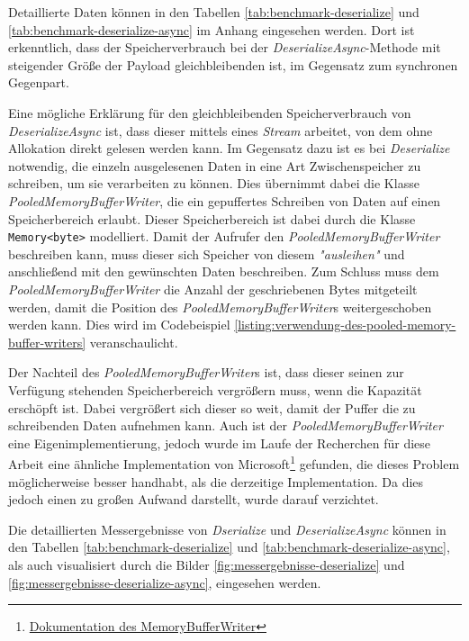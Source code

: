 Detaillierte Daten können in den Tabellen \ref{tab:benchmark-deserialize} und \ref{tab:benchmark-deserialize-async} im Anhang eingesehen werden. Dort ist erkenntlich, dass der Speicherverbrauch bei der \textit{DeserializeAsync}-Methode mit steigender Größe der Payload gleichbleibenden ist, im Gegensatz zum synchronen Gegenpart.

Eine mögliche Erklärung für den gleichbleibenden Speicherverbrauch von \textit{DeserializeAsync} ist, dass dieser mittels eines \textit{Stream} arbeitet, von dem ohne Allokation direkt gelesen werden kann. Im Gegensatz dazu ist es bei \textit{Deserialize} notwendig, die einzeln ausgelesenen Daten in eine Art Zwischenspeicher zu schreiben, um sie verarbeiten zu können. Dies übernimmt dabei die Klasse \textit{PooledMemoryBufferWriter}, die ein gepuffertes Schreiben von Daten auf einen Speicherbereich erlaubt. Dieser Speicherbereich ist dabei durch die Klasse \texttt{Memory<byte>} modelliert. Damit der Aufrufer den \textit{PooledMemoryBufferWriter} beschreiben kann, muss dieser sich Speicher von diesem \textit{"ausleihen"} und anschließend mit den gewünschten Daten beschreiben. Zum Schluss muss dem \textit{PooledMemoryBufferWriter} die Anzahl der geschriebenen Bytes mitgeteilt werden, damit die Position des \textit{PooledMemoryBufferWriter}s weitergeschoben werden kann. Dies wird im Codebeispiel \ref{listing:verwendung-des-pooled-memory-buffer-writers} veranschaulicht.

Der Nachteil des \textit{PooledMemoryBufferWriter}s ist, dass dieser seinen zur Verfügung stehenden Speicherbereich vergrößern muss, wenn die Kapazität erschöpft ist. Dabei vergrößert sich dieser so weit, damit der Puffer die zu schreibenden Daten aufnehmen kann. Auch ist der \textit{PooledMemoryBufferWriter} eine Eigenimplementierung, jedoch wurde im Laufe der Recherchen für diese Arbeit eine ähnliche Implementation von Microsoft\footnote{\href{https://docs.microsoft.com/en-us/dotnet/api/microsoft.toolkit.highperformance.buffers.memorybufferwriter-1?view=win-comm-toolkit-dotnet-7.0}{Dokumentation des MemoryBufferWriter}} gefunden, die dieses Problem möglicherweise besser handhabt, als die derzeitige Implementation. Da dies jedoch einen zu großen Aufwand darstellt, wurde darauf verzichtet.

Die detaillierten Messergebnisse von \textit{Dserialize} und \textit{DeserializeAsync} können in den Tabellen \ref{tab:benchmark-deserialize} und \ref{tab:benchmark-deserialize-async}, als auch visualisiert durch die Bilder \ref{fig:messergebnisse-deserialize} und \ref{fig:messergebnisse-deserialize-async}, eingesehen werden.

